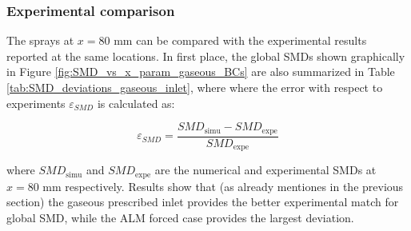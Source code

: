 \subsubsection*{Experimental comparison}

The sprays at $x = 80$ mm can be compared with the experimental results reported at the same locations. In first place, the global SMDs shown graphically in Figure \ref{fig:SMD_vs_x_param_gaseous_BCs} are also summarized in Table \ref{tab:SMD_deviations_gaseous_inlet}, where where the error with respect to experiments $\varepsilon_{SMD}$ is calculated as:

\begin{equation}
\label{eq:error_expe_SMD_LGS_simus}
\varepsilon_{SMD} = \frac{SMD_\mathrm{simu} - SMD_\mathrm{expe}}{SMD_\mathrm{expe}}
\end{equation}

where $SMD_\mathrm{simu}$ and $SMD_\mathrm{expe}$ are the numerical and experimental SMDs at $x = 80$ mm respectively. Results show that (as already mentiones in the previous section) the gaseous prescribed inlet provides the better experimental match for global SMD, while the ALM forced case provides the largest deviation. %




